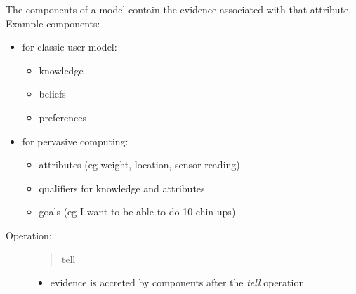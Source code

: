 \documentclass[a4paper,10pt,english]{sphinxmanual}
\begin{document}
The components of a model contain the evidence associated with that attribute. Example components:
\begin{itemize}
\item {} 
for classic user model:
\begin{itemize}
\item {} 
knowledge

\item {} 
beliefs

\item {} 
preferences

\end{itemize}

\item {} 
for pervasive computing:
\begin{itemize}
\item {} 
attributes (eg weight, location, sensor reading)

\item {} 
qualifiers for knowledge and attributes

\item {} 
goals (eg I want to be able to do 10 chin-ups)

\end{itemize}

\end{itemize}
\begin{description}
\item[{Operation:}] \leavevmode\begin{quote}

tell
\end{quote}
\begin{itemize}
\item {} 
evidence is accreted by components after the \emph{tell} operation

\end{itemize}

\end{description}
\end{document}
